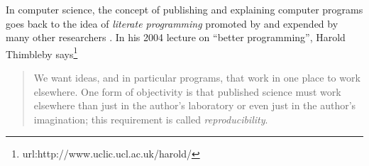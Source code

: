 In computer science, the concept of publishing and explaining computer
programs goes back to the idea of \emph{literate programming} promoted
by \cite{knuth} and expended by many other researchers
\cite[]{thimbleby}. In his 2004 lecture on ``better programming'',
Harold Thimbleby says\footnote{url:http://www.uclic.ucl.ac.uk/harold/}
\begin{quote}
  We want ideas, and in particular programs, that work in one place to
  work elsewhere. One form of objectivity is that published science
  must work elsewhere than just in the author's laboratory or even
  just in the author's imagination; this requirement is called
  \emph{reproducibility}.
\end{quote}

\begin{comment}
The quest for peer review and reproducibility is especially important
for computational geosciences and computational geophysics in
particular. The very first paper published in \emph{Geophysics} was
titled ``Black magic in geophysical prospecting''
\cite[]{GEO01-01-00010008,TLE02-03-00280031} and presented an account
of different ``magical'' methods of oil explorations promoted by
entrepreneurs in the early days of geophysical exploration industry.
Although none of these methods exist today, it is not a secret that
industrial practice is full of nearly magical tricks, often hidden
besides a scientific appearance. Only a scrutiny of peer review and
result verification can help us distinguish magic from science and
advance the latter.
\end{comment}

